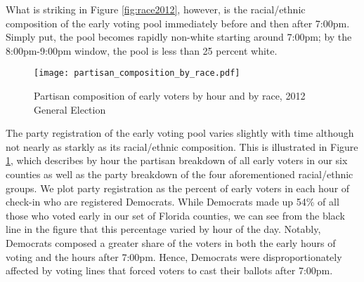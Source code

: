 \documentclass[12pt,titlepage]{article}
\begin{document}




What is striking in Figure \ref{fig:race2012}, however, is the
racial/ethnic composition of the early voting pool immediately before
and then after 7:00pm.  Simply put, the pool becomes rapidly non-white
starting around 7:00pm; by the 8:00pm-9:00pm window, the pool is less
than 25 percent white.

\begin{figure}[!ht]
\caption{Partisan composition of early voters by hour and by race, 2012
  General Election}
  \label{fig:party2012}
  \centering
    \centering\texttt{[image: partisan\_composition\_by\_race.pdf]}
\end{figure}

The party registration of the early voting pool varies slightly with
time although not nearly as starkly as its racial/ethnic composition.
This is illustrated in Figure \ref{fig:party2012}, which describes by
hour the partisan breakdown of all early voters in our six counties as
well as the party breakdown of the four aforementioned racial/ethnic
groups.  We plot party registration as the percent of early voters in
each hour of check-in who are registered Democrats.  While Democrats
made up 54\% of all those who voted early in our set of Florida
counties, we can see from the black line in the figure that this
percentage varied by hour of the day.  Notably, Democrats composed a
greater share of the voters in both the early hours of voting and the
hours after 7:00pm.  Hence, Democrats were disproportionately affected
by voting lines that forced voters to cast their ballots after 7:00pm.
\end{document}
